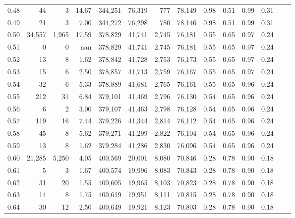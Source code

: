 \begin{tabular}{rrrrrrrrrrrrrr}
0.48 &      44 &       3 &     14.67 &  344,251 &   76,319 &     777 &  78,149 &  0.98 &  0.51 &  0.99 &      0.31 \\
0.49 &      21 &       3 &      7.00 &  344,272 &   76,298 &     780 &  78,146 &  0.98 &  0.51 &  0.99 &      0.31 \\
0.50 &  34,557 &   1,965 &     17.59 &  378,829 &   41,741 &   2,745 &  76,181 &  0.55 &  0.65 &  0.97 &      0.24 \\
0.51 &       0 &       0 &       nan &  378,829 &   41,741 &   2,745 &  76,181 &  0.55 &  0.65 &  0.97 &      0.24 \\
0.52 &      13 &       8 &      1.62 &  378,842 &   41,728 &   2,753 &  76,173 &  0.55 &  0.65 &  0.97 &      0.24 \\
0.53 &      15 &       6 &      2.50 &  378,857 &   41,713 &   2,759 &  76,167 &  0.55 &  0.65 &  0.97 &      0.24 \\
0.54 &      32 &       6 &      5.33 &  378,889 &   41,681 &   2,765 &  76,161 &  0.55 &  0.65 &  0.96 &      0.24 \\
0.55 &     212 &      31 &      6.84 &  379,101 &   41,469 &   2,796 &  76,130 &  0.54 &  0.65 &  0.96 &      0.24 \\
0.56 &       6 &       2 &      3.00 &  379,107 &   41,463 &   2,798 &  76,128 &  0.54 &  0.65 &  0.96 &      0.24 \\
0.57 &     119 &      16 &      7.44 &  379,226 &   41,344 &   2,814 &  76,112 &  0.54 &  0.65 &  0.96 &      0.24 \\
0.58 &      45 &       8 &      5.62 &  379,271 &   41,299 &   2,822 &  76,104 &  0.54 &  0.65 &  0.96 &      0.24 \\
0.59 &      13 &       8 &      1.62 &  379,284 &   41,286 &   2,830 &  76,096 &  0.54 &  0.65 &  0.96 &      0.24 \\
0.60 &  21,285 &   5,250 &      4.05 &  400,569 &   20,001 &   8,080 &  70,846 &  0.28 &  0.78 &  0.90 &      0.18 \\
0.61 &       5 &       3 &      1.67 &  400,574 &   19,996 &   8,083 &  70,843 &  0.28 &  0.78 &  0.90 &      0.18 \\
0.62 &      31 &      20 &      1.55 &  400,605 &   19,965 &   8,103 &  70,823 &  0.28 &  0.78 &  0.90 &      0.18 \\
0.63 &      14 &       8 &      1.75 &  400,619 &   19,951 &   8,111 &  70,815 &  0.28 &  0.78 &  0.90 &      0.18 \\
0.64 &      30 &      12 &      2.50 &  400,649 &   19,921 &   8,123 &  70,803 &  0.28 &  0.78 &  0.90 &      0.18 \\

\end{tabular}
